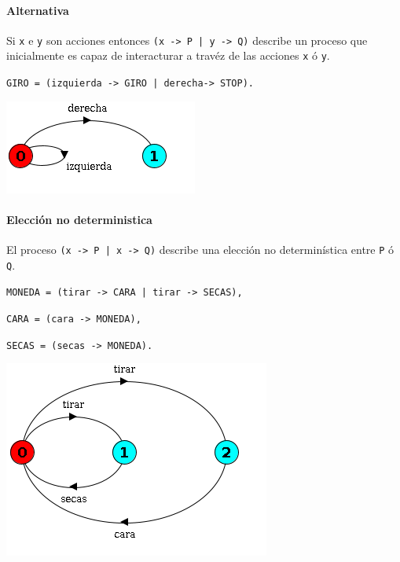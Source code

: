 \paragraph{Alternativa} 
Si \texttt{x} e \texttt{y} son acciones entonces \texttt{(x -> P | y -> Q)} describe un proceso que inicialmente es capaz de interacturar a travéz de las acciones \texttt{x} ó \texttt{y}. 
\begin{center}
\begin{minipage}{0.55\textwidth}
\texttt{GIRO = (izquierda -> GIRO | derecha-> STOP).}
\end{minipage}

\vspace*{0.25cm}
\begin{minipage}{0.5\textwidth}
	\includegraphics[scale=0.75]{imagenes/lts-giro}
\end{minipage}
\end{center}

\paragraph{Elección no deterministica}
El proceso \texttt{(x -> P | x -> Q)} describe una elección no determinística entre \texttt{P} ó \texttt{Q}.
\begin{center}
\begin{minipage}{0.55\textwidth}
\texttt{MONEDA = (tirar -> CARA | tirar -> SECAS),}

\texttt{CARA = (cara -> MONEDA),}

\texttt{SECAS = (secas -> MONEDA).}
\end{minipage}

\vspace*{0.25cm}
\begin{minipage}{1\textwidth}
\centering
	\includegraphics[scale=0.75]{imagenes/lts-moneda}
\end{minipage}
\end{center}
